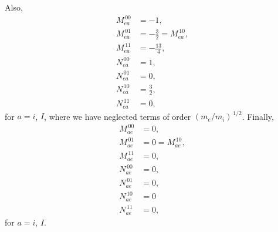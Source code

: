 \documentclass[12pt]{article}
\begin{document}
Also,
\begin{align}
M_{ea}^{\,00} &= -1,\\[0.5ex]
M_{ea}^{\,01}&= -\frac{3}{2}= M_{ea}^{\,10},\\[0.5ex]
M_{ea}^{\,11}& = -\frac{13}{4},\\[0.5ex]
N_{ea}^{\,00} &= 1,\\[0.5ex]
N_{ea}^{\,01}&= 0,\\[0.5ex]
N_{ea}^{\,10}&=\frac{3}{2},\\[0.5ex]
N_{ea}^{\,11}& =0,
\end{align}
for $a=i$, $I$, where we have neglected terms of order $(m_e/m_i)^{\,1/2}$. Finally,
\begin{align}
M_{ae}^{\,00} &= 0,\\[0.5ex]
M_{ae}^{\,01}&=0= M_{ae}^{\,10},\\[0.5ex]
M_{ae}^{\,11}& = 0,\\[0.5ex]
N_{ae}^{\,00} &= 0,\\[0.5ex]
N_{ae}^{\,01}&= 0,\\[0.5ex]
N_{ae}^{\,10}&=0\\[0.5ex]
N_{ae}^{\,11}& =0,
\end{align}
for $a=i$, $I$. 
\end{document}
